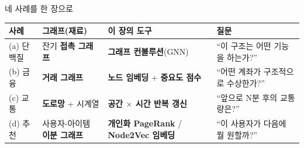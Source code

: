 \begin{frame}{네 사례를 한 장으로}
  \small
  \begin{tabular}{@{}p{}p{}p{}p{}@{}}
    \toprule
    사례 & 그래프(재료) & 이 장의 도구 & 질문 \\
    \midrule
    (a) 단백질 & 잔기 \textbf{접촉 그래프}
      & \textbf{그래프 컨볼루션}(GNN) & ``이 구조는 어떤 기능을
      하는가?'' \\
    (b) 금융 & \textbf{거래 그래프}
      & \textbf{노드 임베딩} + \textbf{중요도 점수} & ``어떤 계좌가
      구조적으로 수상한가?'' \\
    (c) 교통 & \textbf{도로망} + 시계열
      & \textbf{공간 $\times$ 시간 반복 갱신} & ``앞으로 N분 후의
      교통량은?'' \\
    (d) 추천 & 사용자-아이템 \textbf{이분 그래프}
      & \textbf{개인화 PageRank} / \textbf{Node2Vec 임베딩} &
      ``이 사용자가 다음에 뭘 원할까?'' \\
    \bottomrule
  \end{tabular}
\end{frame}
